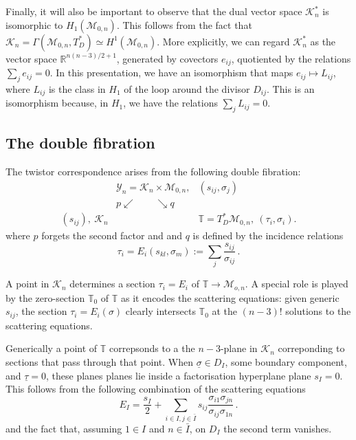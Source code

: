 \documentclass[11pt]{article}
\newcommand{\R}{\mathbb{R}}
\newcommand{\T}{\mathbb{T}}
\newcommand{\cK}{\mathcal{K}}
\newcommand{\cM}{\mathcal{M}}
\newcommand{\cY}{\mathcal{Y}}
\newcommand{\bs}{\underline{\sigma}}
\newcommand{\bt}{\underline{\tau}}
\newcommand{\1}{{\rm 1\hskip-0.25em I}}
\begin{document}
Finally, it will also be important to observe that the dual vector space $\cK_n^*$ is isomorphic to $H_1(\cM_{0,n})$. This follows from the fact that $\cK_n = \Gamma(\cM_{0,n},T^*_D) \simeq H^1(\cM_{0,n}).$ More explicitly, we can regard $\cK_n^*$ as the vector space $\R^{n(n-3)/2+1}$, generated by covectors $e_{ij}$, quotiented by the relations $\sum_j e_{ij} = 0$. In this presentation, we have an isomorphism that maps $e_{ij} \mapsto L_{ij}$, where $L_{ij}$ is the class in $H_1$ of the loop around the divisor $D_{ij}$. This is an isomorphism because, in $H_1$, we have the relations $\sum_j L_{ij} = 0$. 

\subsection{The double fibration}
The twistor correspondence  arises from the following double fibration:
\begin{eqnarray}
~& \cY_n=\cK_n\times \cM_{0,n},&(s_{ij},\sigma_j)\nonumber\\
&p\swarrow\qquad\searrow q&\nonumber\\
(s_{ij}),~ \cK_n&&\T= T^*_D \cM_{0,n}, ~ (\tau_i,\sigma_i) . 
\end{eqnarray}
where $p$ forgets the second factor and and
$q$ is defined by  the incidence relations
\begin{equation}
\tau_i =E_i(s_{kl}, \sigma_m):=\sum_j \frac{s_{ij}}{\sigma_{ij}}\, . \label{incidence}
\end{equation}

A point in $\cK_n$ determines a section $\tau_i=E_i$ of $\T\rightarrow \cM_{o,n}$. A special role is played by the zero-section $\T_0$ of $\T$ as it encodes the scattering equations: given generic $s_{ij}$, the section $\tau_i=E_i(\sigma)$ clearly intersects $\T_0$ at the $(n-3)!$ solutions to the scattering equations.


Generically a point of $\T$ correpsonds to a the $n-3$-plane in $\cK_n$ correponding to sections that pass through that point. 
When $\bs \in D_I$, some boundary component,  and $\bt=0$,   these planes planes lie inside a factorisation hyperplane plane $s_I=0$. 
This follows from the following  combination \cite{Dolan:2013isa} of the scattering equations
\begin{equation}
E_I=\frac{s_I}{2} + \sum_{i\in I, j\in \bar I} s_{ij} \frac{\sigma_{i1}\sigma_{jn}}{\sigma_{ij}\sigma_{1n}}\, .
\end{equation}
and the fact that, assuming $1\in I$ and $n\in \bar I$, on $D_I$ the second term vanishes.
\end{document}
